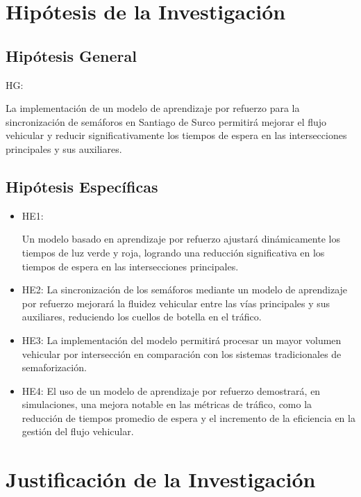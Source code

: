 \section{Hipótesis de la Investigación}
\subsection{Hipótesis General}
HG: \newcommand{\HipotesisGeneral}{
La implementación de un modelo de aprendizaje por refuerzo para la sincronización de semáforos en Santiago de Surco permitirá mejorar el flujo vehicular y reducir significativamente los tiempos de espera en las intersecciones principales y sus auxiliares.
}
\HipotesisGeneral


\subsection{Hipótesis Específicas}
\newcommand{\Hone}{
Un modelo basado en aprendizaje por refuerzo ajustará dinámicamente los tiempos de luz verde y roja, logrando una reducción significativa en los tiempos de espera en las intersecciones principales.

}
\newcommand{\Htwo}{
La sincronización de los semáforos mediante un modelo de aprendizaje por refuerzo mejorará la fluidez vehicular entre las vías principales y sus auxiliares, reduciendo los cuellos de botella en el tráfico.
}
\newcommand{\Hthree}{
La implementación del modelo permitirá procesar un mayor volumen vehicular por intersección en comparación con los sistemas tradicionales de semaforización.
}
\newcommand{\Hfour}{
El uso de un modelo de aprendizaje por refuerzo demostrará, en simulaciones, una mejora notable en las métricas de tráfico, como la reducción de tiempos promedio de espera y el incremento de la eficiencia en la gestión del flujo vehicular.
}

\begin{itemize}
	\item HE1: {\Hone}
	\item HE2: {\Htwo}
	\item HE3: {\Hthree}
	\item HE4: {\Hfour}
\end{itemize}

\section{Justificación de la Investigación}

